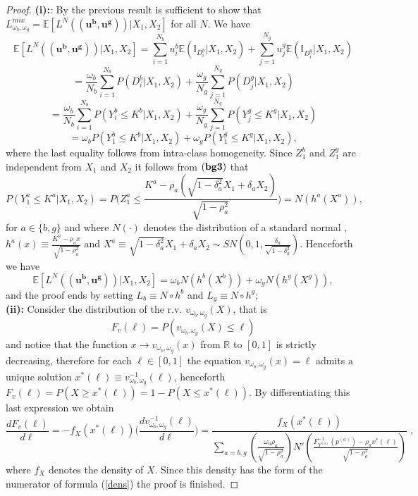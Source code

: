 \documentclass[10pt,a4paper]{amsart}
\newcommand{\E}{\mathbb{E}}
\begin{document}
\begin{proof}
 {\bf{(i):}}: By the previous result is sufficient to show that $L^{mix}_{\omega_b,\omega_g}=\E[L^N(\mathbf{(u^b,u^g)}) | X_1, X_2 ]$ for all $N$. We have
$$
\E[L^N(\mathbf{(u^b,u^g)}) | X_1, X_2 ]=\sum_{i=1}^{N_b}u^b_i\E(\mathbb{I}_{D^b_i}|X_1,X_2)+\sum_{j=1}^{N_g}u^g_j\E(\mathbb{I}_{D^g_i}|X_1,X_2)
$$
$$
=\frac{\omega_b}{N_b}\sum_{i=1}^{N_b}P(D^b_i|X_1,X_2)+\frac{\omega_g}{N_g}\sum_{j=1}^{N_g}P({D^g_j}|X_1,X_2)
$$
$$
=\frac{\omega_b}{N_b}\sum_{i=1}^{N_b}P(Y_i^b\leq K^b|X_1,X_2)+\frac{\omega_g}{N_g}\sum_{j=1}^{N_g}P(Y_j^g\leq K^g|X_1,X_2)
$$
$$
={\omega_b}P(Y_1^b\leq K^b|X_1,X_2)+{\omega_g}P(Y_1^g\leq K^g|X_1,X_2),
$$
where the last equality follows from intra-class homogeneity. Since $Z_1^b$ and $Z_1^g$ are independent from $X_1$ and $X_2$ it follows from ${\bf{(bg3)}}$ that
$$
P(Y_1^a\leq K^a|X_1,X_2)=P\biggl(Z_1^a\leq \frac{K^a-\rho_a(\sqrt{1-\delta^2_a}X_1+\delta_aX_2)}{\sqrt{1-\rho^2_a}}\biggr)=N(h^a(X^a)),
$$
for $a\in \{b,g\}$ and where $N(\cdot)$ denotes the distribution of a standard normal , $h^a(x)\equiv \frac{K^a-\rho_a x}{\sqrt{1-\rho^2_a}}$ and $X^a \equiv \sqrt{1-\delta^2_a} X_1+\delta_a X_2 \sim SN(0,1,\frac{\delta_a}{\sqrt{1-\delta_a^2}})$. Henceforth we have
$$
\E[L^N(\mathbf{(u^b,u^g)}) | X_1, X_2 ]={\omega_b}N(h^b(X^b))+{\omega_g}N(h^g(X^g)),
$$
and the proof ends by setting $L_b\equiv N\circ h^b$ and $L_g\equiv N\circ h^g$; \\
 {\bf{(ii):}} Consider the distribution of the r.v. $v_{\omega_b,\omega_g}(X)$, that is 
 $$
 F_v(\ell)=P(v_{\omega_b,\omega_g}(X)\leq \ell)
 $$
 and notice that the function $x\to v_{\omega_b,\omega_g}(x)$ from  $\mathbb{R}$ to $[0,1]$ is strictly decreasing, therefore for each $\ell\in[0,1]$ the equation $v_{\omega_b,\omega_g}(x)=\ell$ admits a unique solution $x^*(\ell)\equiv v_{\omega_b,\omega_g}^{-1}(\ell)$, henceforth $F_v(\ell)=P(X\geq x^*(\ell))=1-P(X\leq x^*(\ell))$. By differentiating this last expression we obtain 
 $$
 \frac{d F_v(\ell)}{d\ell}=-f_X(x^*(\ell))\bigg(\frac{dv_{\omega_b,\omega_g}^{-1}(\ell)}{d\ell}\bigg)=\frac{f_X(x^*(\ell))}{\sum_{a = b,g}\left(\frac{\omega_a\rho_a}{\sqrt{1-\rho_a^2}}\right)N'\left(\frac{F_{Y^{(a)}}^{-1}(p^{(a)})-\rho_a x^*(\ell)}{\sqrt{1-\rho_a^2}} \right) }\;,
 $$
where $f_X$ denotes the density of $X$. Since this density has the form of the numerator of formula (\ref{dens}) the proof is finished.
\end{proof}
\end{document}
